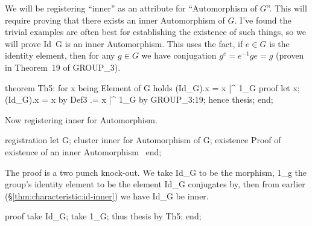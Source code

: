 \nwendcode{}\nwdocspar

\label{thm:characteristic:id-inner}
We will be registering ``inner'' as an attribute for ``Automorphism
of $G$''. This will require proving that there exists an inner
Automorphism of $G$. I've found the trivial examples are often best for
establishing the existence of such things, so we will prove {\Tt{}Id\ G\nwendquote} is
an inner Automorphism. This uses the fact, if $e\in G$ is the identity
element, then for any $g\in G$ we have conjugation $g^{e} = e^{-1}ge=g$
(proven in Theorem~19 of {\Tt{}GROUP{\_}3\nwendquote}).

\nwenddocs{}\endmoddef\nwstartdeflinemarkup{}\nwenddeflinemarkup
theorem Th5:
  for x being Element of G holds (Id_G).x = x |^ 1_G
proof
  let x;
  (Id_G).x = x by Def3
          .= x |^ 1_G by GROUP_3:19;
  hence thesis;
end;

\nwendcode{}\nwdocspar

\M Now registering {\Tt{}inner\nwendquote} for {\Tt{}Automorphism\nwendquote}.

\nwenddocs{}\endmoddef\nwstartdeflinemarkup{}\nwenddeflinemarkup
registration
  let G;
  cluster inner for Automorphism of G;
  existence
  \LA{}Proof of existence of an inner Automorphism~{\nwtagstyle{}}\RA{}
end;

\nwendcode{}\nwdocspar

 The proof is a two punch knock-out. We take {\Tt{}Id{\_}G\nwendquote} to be the
morphism, {\Tt{}1{\_}g\nwendquote} the group's identity element to be the element
{\Tt{}Id{\_}G\nwendquote} conjugates by, then from earlier (\S\ref{thm:characteristic:id-inner})
we have {\Tt{}Id{\_}G\nwendquote} be inner.

\nwenddocs{}\endmoddef\nwstartdeflinemarkup{}\nwenddeflinemarkup
proof
  take Id_G;
  take 1_G;
  thus thesis by Th5;
end;

